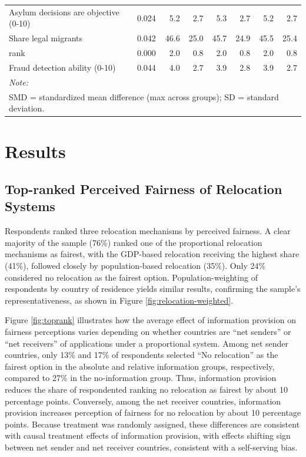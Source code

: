 \documentclass[
  12pt,
  a4paper,
]{article}
\begin{document}
\begin{table}
\begin{tabular}[t]{llrrrrrr}
Asylum decisions are objective (0-10) & 0.024 & 5.2 & 2.7 & 5.3 & 2.7 & 5.2 & 2.7\\
Share legal migrants & 0.042 & 46.6 & 25.0 & 45.7 & 24.9 & 45.5 & 25.4\\
rank & 0.000 & 2.0 & 0.8 & 2.0 & 0.8 & 2.0 & 0.8\\
\addlinespace
Fraud detection ability (0-10) & 0.044 & 4.0 & 2.7 & 3.9 & 2.8 & 3.9 & 2.7\\
\bottomrule
\multicolumn{8}{l}{\rule{0pt}{1em}\textit{Note: }}\\
\multicolumn{8}{l}{\rule{0pt}{1em}SMD = standardized mean difference (max across groups); SD = standard deviation.}\\
\end{tabular}
\end{table}

\section{Results}\label{results}

\subsection{Top-ranked Perceived Fairness of Relocation Systems}\label{top-ranked-perceived-fairness-of-relocation-systems}

Respondents ranked three relocation mechanisms by perceived fairness. A clear majority of the sample (76\%) ranked one of the proportional relocation mechanisms as fairest, with the GDP-based relocation receiving the highest share (41\%), followed closely by population-based relocation (35\%). Only 24\% considered no relocation as the fairest option. Population-weighting of respondents by country of residence yields similar results, confirming the sample's representativeness, as shown in Figure \ref{fig:relocation-weighted}.

Figure \ref{fig:toprank} illustrates how the average effect of information provision on fairness perceptions varies depending on whether countries are ``net senders'' or ``net receivers'' of applications under a proportional system. Among net sender countries, only 13\% and 17\% of respondents selected ``No relocation'' as the fairest option in the absolute and relative information groups, respectively, compared to 27\% in the no-information group. Thus, information provision reduces the share of respondented ranking no relocation as fairest by about 10 percentage points. Conversely, among the net receiver countries, information provision increases perception of fairness for no relocation by about 10 percentage points. Because treatment was randomly assigned, these differences are consistent with causal treatment effects of information provision, with effects shifting sign between net sender and net receiver countries, consistent with a self-serving bias.
\end{document}
